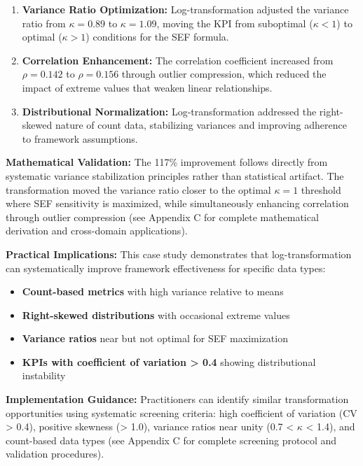 \begin{enumerate}
    \item \textbf{Variance Ratio Optimization:} Log-transformation adjusted the variance ratio from $\kappa = 0.89$ to $\kappa = 1.09$, moving the KPI from suboptimal ($\kappa < 1$) to optimal ($\kappa > 1$) conditions for the SEF formula.
    
    \item \textbf{Correlation Enhancement:} The correlation coefficient increased from $\rho = 0.142$ to $\rho = 0.156$ through outlier compression, which reduced the impact of extreme values that weaken linear relationships.
    
    \item \textbf{Distributional Normalization:} Log-transformation addressed the right-skewed nature of count data, stabilizing variances and improving adherence to framework assumptions.
\end{enumerate}

\textbf{Mathematical Validation:} The 117\% improvement follows directly from systematic variance stabilization principles rather than statistical artifact. The transformation moved the variance ratio closer to the optimal $\kappa = 1$ threshold where SEF sensitivity is maximized, while simultaneously enhancing correlation through outlier compression (see Appendix C for complete mathematical derivation and cross-domain applications).

\textbf{Practical Implications:}
This case study demonstrates that log-transformation can systematically improve framework effectiveness for specific data types:

\begin{itemize}
    \item \textbf{Count-based metrics} with high variance relative to means
    \item \textbf{Right-skewed distributions} with occasional extreme values  
    \item \textbf{Variance ratios} near but not optimal for SEF maximization
    \item \textbf{KPIs with coefficient of variation > 0.4} showing distributional instability
\end{itemize}

\textbf{Implementation Guidance:} Practitioners can identify similar transformation opportunities using systematic screening criteria: high coefficient of variation (CV > 0.4), positive skewness (> 1.0), variance ratios near unity (0.7 < $\kappa$ < 1.4), and count-based data types (see Appendix C for complete screening protocol and validation procedures).

